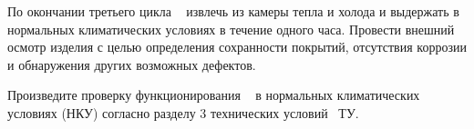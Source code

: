     \subpoint По окончании третьего цикла \DocProductShortTitle~ извлечь из камеры тепла и холода и выдержать в нормальных климатических условиях в течение одного часа.
    \subpoint Провести внешний осмотр изделия с целью определения сохранности покрытий, отсутствия коррозии и обнаружения других возможных дефектов.

      \subpoint Произведите проверку функционирования \DocProductShortTitle~ в нормальных климатических условиях (НКУ) согласно разделу 3 технических условий \DocModuleSignature~ТУ.
    